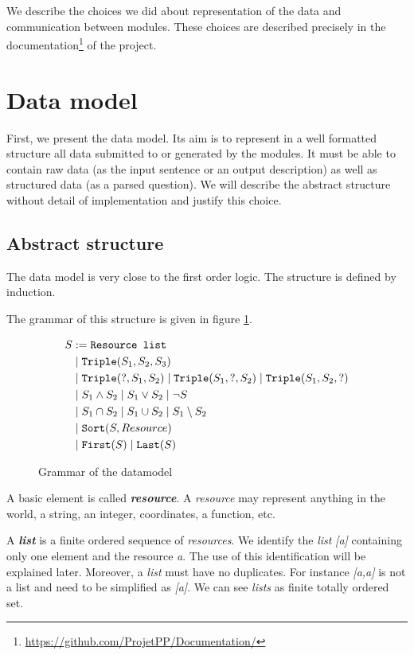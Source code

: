 We describe the choices we did about representation of the data and communication between modules.
These choices are described precisely in the documentation\footnote{\url{https://github.com/ProjetPP/Documentation/}} of the project.

\section{Data model}
\label{rdf}

First, we present the data model. Its aim is to represent in a well formatted structure all data submitted to or generated by the modules. It must be able to contain raw data (as the input sentence or an output description) as well as structured data (as a parsed question). We will describe the abstract structure without detail of implementation and justify this choice.

\subsection{Abstract structure}

The data model is very close to the first order logic. The structure is defined by induction.

The grammar of this structure is given in figure \ref{datamodel:grammar}.

\begin{figure}[ht!]
$$
\begin{aligned}
S &:= \texttt{Resource list}\\
  &\mid \texttt{Triple}(S_1,S_2,S_3)\\
  &\mid \texttt{Triple}(?,S_1,S_2) \mid \texttt{Triple}(S_1,?,S_2) \mid \texttt{Triple}(S_1,S_2,?)\\
  &\mid S_1 \wedge S_2 \mid S_1 \vee S_2 \mid \neg S\\
  &\mid S_1 \cap S_2 \mid S_1 \cup S_2 \mid S_1 \setminus S_2\\
  &\mid \texttt{Sort}(S,Resource)\\
  &\mid \texttt{First}(S) \mid \texttt{Last}(S)\\
\end{aligned}
$$
\caption{Grammar of the datamodel}
\label{datamodel:grammar}
\end{figure}

A basic element is called \textsl{\bf resource}. A \textsl{resource} may represent anything in the world, a string, an integer, coordinates, a function, etc.

A \textsl{\bf list} is a finite ordered sequence of \textsl{resources}. We identify the \textsl{list} \textsl{[a]} containing only one element and the resource \textsl{a}. The use of this identification will be explained later. Moreover, a \textsl{list} must have no duplicates. For instance \textsl{[a,a]} is not a list and need to be simplified as \textsl{[a]}. We can see \textsl{lists} as finite totally ordered set.

